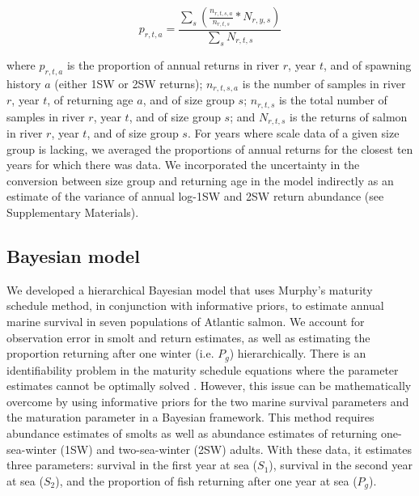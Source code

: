 \documentclass[12pt]{article}
\newcommand{\So}{$S_{1}$\xspace}
\newcommand{\St}{$S_{2}$\xspace}
\newcommand{\Pg}{$P_g$\xspace}
\begin{document}
\begin{equation}
    p_{r,t,a} = \frac{\sum_{s}{(\frac{n_{r,t,s,a}}{n_{r,t,s}} * N_{r,y,s})}}{\sum_{s}{N_{r,t,s}}}
\end{equation}

where $p_{r,t,a}$ is the proportion of annual returns in river $r$, year $t$,
and of spawning history $a$ (either 1SW or 2SW returns); $n_{r,t,s,a}$ is the
number of samples in river $r$, year $t$, of returning age $a$, and of size
group $s$; $n_{r,t,s}$ is the total number of samples in river $r$, year $t$,
and of size group $s$; and $N_{r,t,s}$ is the returns of salmon
in river $r$, year $t$, and of size group $s$.
For years where scale data of a given size group is lacking,
we averaged the proportions of annual returns
for the closest ten years for which there was data.
We incorporated the uncertainty in the conversion between
size group and returning age in the model indirectly as an estimate
of the variance of annual log-1SW and 2SW return abundance (see Supplementary Materials).

\subsection*{Bayesian model}

We developed a hierarchical Bayesian model that uses Murphy's maturity
schedule method, in conjunction with informative priors, to estimate annual
marine survival in seven populations of Atlantic salmon. We account for
observation error in smolt and return estimates, as well as estimating the
proportion returning after one winter (i.e. \Pg) hierarchically.
There is an identifiability problem in the maturity schedule equations where
the parameter estimates cannot be optimally solved \citep{Chaput2003a}.
However, this issue can be mathematically overcome by
using informative priors for the two marine survival parameters and the maturation
parameter in a Bayesian framework.
This method requires abundance estimates of smolts as well as abundance estimates
of returning one-sea-winter (1SW) and two-sea-winter (2SW) adults. With these data,
it estimates three parameters: survival in the first year at sea (\So), survival
in the second year at sea (\St), and the proportion of fish returning after one
year at sea (\Pg).
\end{document}
